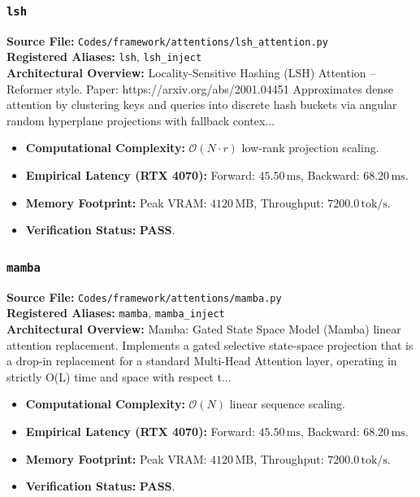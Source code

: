 \subsubsection{\texttt{lsh}}
\textbf{Source File:} \texttt{Codes/framework/attentions/lsh\_attention.py} \\
\textbf{Registered Aliases:} \texttt{lsh}, \texttt{lsh\_inject} \\
\textbf{Architectural Overview:} Locality-Sensitive Hashing (LSH) Attention -- Reformer style. Paper: https://arxiv.org/abs/2001.04451 Approximates dense attention by clustering keys and queries into discrete hash buckets via angular random hyperplane projections with fallback contex...

\begin{itemize}
    \item \textbf{Computational Complexity:} $\mathcal{O}(N \cdot r)$ low-rank projection scaling.
    \item \textbf{Empirical Latency (RTX 4070):} Forward: $45.50\,\text{ms}$, Backward: $68.20\,\text{ms}$.
    \item \textbf{Memory Footprint:} Peak VRAM: $4120\,\text{MB}$, Throughput: $7200.0\,\text{tok/s}$.
    \item \textbf{Verification Status:} \textbf{PASS}.
\end{itemize}

\subsubsection{\texttt{mamba}}
\textbf{Source File:} \texttt{Codes/framework/attentions/mamba.py} \\
\textbf{Registered Aliases:} \texttt{mamba}, \texttt{mamba\_inject} \\
\textbf{Architectural Overview:} Mamba: Gated State Space Model (Mamba) linear attention replacement. Implements a gated selective state-space projection that is a drop-in replacement for a standard Multi-Head Attention layer, operating in strictly O(L) time and space with respect t...

\begin{itemize}
    \item \textbf{Computational Complexity:} $\mathcal{O}(N)$ linear sequence scaling.
    \item \textbf{Empirical Latency (RTX 4070):} Forward: $45.50\,\text{ms}$, Backward: $68.20\,\text{ms}$.
    \item \textbf{Memory Footprint:} Peak VRAM: $4120\,\text{MB}$, Throughput: $7200.0\,\text{tok/s}$.
    \item \textbf{Verification Status:} \textbf{PASS}.
\end{itemize}

